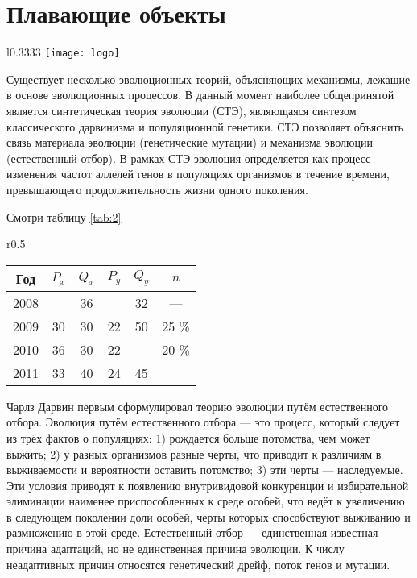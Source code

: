 \section{Плавающие объекты}

\begin{wrapfigure}{l}{0.3333\linewidth}
    \texttt{[image: logo]}
    \caption{Картинка с обтеканием}
\end{wrapfigure}

Существует несколько эволюционных теорий, объясняющих механизмы, лежащие в основе эволюционных процессов.
В данный момент наиболее общепринятой является синтетическая теория эволюции (СТЭ), являющаяся синтезом классического дарвинизма и популяционной генетики.
СТЭ позволяет объяснить связь материала эволюции (генетические мутации) и механизма эволюции (естественный отбор).
В рамках СТЭ эволюция определяется как процесс изменения частот аллелей генов в популяциях организмов в течение времени, превышающего продолжительность жизни одного поколения.

Смотри таблицу \ref{tab:2}

\begin{wraptable}{r}{0.5\linewidth}
    \begin{tabular}{|c|c|c|c|c|c|}
        \hline
        Год  & $P_x$ & $Q_x$ & $P_y$ & $Q_y$ & $n$   \\ \hline
        2008 &       & 36    &       & 32    & —     \\ \hline
        2009 & 30    & 30    & 22    & 50    & 25 \% \\ \hline
        2010 & 36    & 30    & 22    &       & 20 \% \\ \hline
        2011 & 33    & 40    & 24    & 45    &       \\ \hline
    \end{tabular}
    \caption{Обтекаемая таблица}\label{tab:2}
\end{wraptable}

Чарлз Дарвин первым сформулировал теорию эволюции путём естественного отбора.
Эволюция путём естественного отбора — это процесс, который следует из трёх фактов о популяциях:
1) рождается больше потомства, чем может выжить;
2) у разных организмов разные черты, что приводит к различиям в выживаемости и вероятности оставить потомство;
3) эти черты — наследуемые.
Эти условия приводят к появлению внутривидовой конкуренции и избирательной элиминации наименее приспособленных к среде особей, что ведёт к увеличению в следующем поколении доли особей, черты которых способствуют выживанию и размножению в этой среде.
Естественный отбор — единственная известная причина адаптаций, но не единственная причина эволюции.
К числу неадаптивных причин относятся генетический дрейф, поток генов и мутации.

